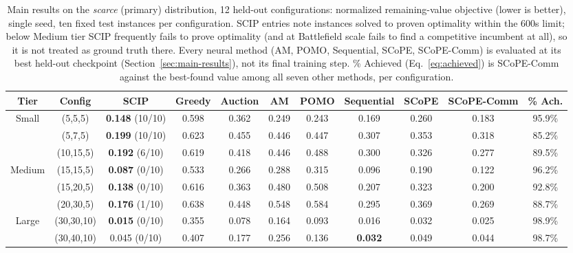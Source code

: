 \begin{table}[htbp]
\centering
\scriptsize
\caption{Main results on the \emph{scarce} (primary) distribution, 12 held-out configurations: normalized remaining-value objective (lower is better), single seed, ten fixed test instances per configuration. SCIP entries note instances solved to proven optimality within the 600s limit; below Medium tier SCIP frequently fails to prove optimality (and at Battlefield scale fails to find a competitive incumbent at all), so it is not treated as ground truth there. Every neural method (AM, POMO, Sequential, SCoPE, SCoPE-Comm) is evaluated at its best held-out checkpoint (Section~\ref{sec:main-results}), not its final training step. \% Achieved (Eq.~\eqref{eq:achieved}) is SCoPE-Comm against the best-found value among all seven other methods, per configuration.}
\label{tab:main_results}
\begin{adjustbox}{max width=\textwidth}
\begin{tabular}{c|c|c|ccccccc|c}
\hline
\textbf{Tier} & \textbf{Config} & \textbf{SCIP} & \textbf{Greedy} & \textbf{Auction} & \textbf{AM} & \textbf{POMO} & \textbf{Sequential} & \textbf{SCoPE} & \textbf{SCoPE-Comm} & \textbf{\% Ach.} \\ \hline
\multirow{3}{*}{Small}       & (5,5,5)     & \textbf{0.148} (10/10) & 0.598 & 0.362 & 0.249 & 0.243 & 0.169 & 0.260 & 0.183 & 95.9\% \\
                              & (5,7,5)     & \textbf{0.199} (10/10) & 0.623 & 0.455 & 0.446 & 0.447 & 0.307 & 0.353 & 0.318 & 85.2\% \\
                              & (10,15,5)   & \textbf{0.192} (6/10)  & 0.619 & 0.418 & 0.446 & 0.488 & 0.300 & 0.326 & 0.277 & 89.5\% \\ \hline
\multirow{3}{*}{Medium}      & (15,15,5)   & \textbf{0.087} (0/10)  & 0.533 & 0.266 & 0.288 & 0.315 & 0.096 & 0.190 & 0.122 & 96.2\% \\
                              & (15,20,5)   & \textbf{0.138} (0/10)  & 0.616 & 0.363 & 0.480 & 0.508 & 0.207 & 0.323 & 0.200 & 92.8\% \\
                              & (20,30,5)   & \textbf{0.176} (1/10)  & 0.638 & 0.448 & 0.548 & 0.584 & 0.295 & 0.369 & 0.269 & 88.7\% \\ \hline
\multirow{3}{*}{Large}       & (30,30,10)  & \textbf{0.015} (0/10) & 0.355 & 0.078 & 0.164 & 0.093 & 0.016 & 0.032 & 0.025 & 98.9\% \\
                              & (30,40,10)  & 0.045 (0/10)  & 0.407 & 0.177 & 0.256 & 0.136 & \textbf{0.032} & 0.049 & 0.044 & 98.7\% \\

\end{tabular}
\end{adjustbox}
\end{table}
